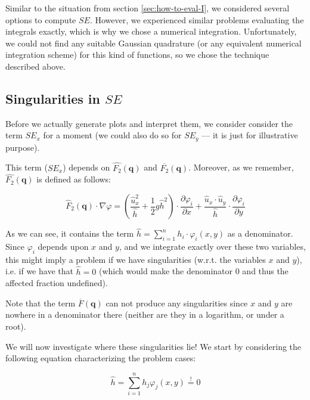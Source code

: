 \documentclass{article}
\newcommand{\pd}[2]{\dfrac{\partial #1}{\partial #2}}
\renewcommand{\phi}{\varphi}
\begin{document}
Similar to the situation from section \ref{sec:how-to-eval-I}, we considered several options to compute $SE$. However, we experienced similar problems evaluating the integrals exactly, which is why we chose a numerical integration. Unfortunately, we could not find any suitable Gaussian quadrature (or any equivalent numerical integration scheme) for this kind of functions, so we chose the technique described above.

\subsection{\texorpdfstring{Singularities in $SE$}{Singularities in SE}}
\label{sec:stiffness-analysis-singularities}

Before we actually generate plots and interpret them, we consider consider the term $SE_x$ for a moment (we could also do so for $SE_y$ --- it is just for illustrative purpose).

This term ($SE_x$) depends on $\widehat{F_2}(\mathbf{q})$ and $\overline{F_2}(\mathbf{q})$. Moreover, as we remember, $\widehat{F_2}(\mathbf{q})$ is defined as follows:

\begin{equation*}
  \widehat{F}_2(\mathbf{q}) \cdot \nabla \phi =
  \left( \frac{\widehat{u}_x^2}{\widehat{h}} + \frac{1}{2} g \widehat{h}^2 \right) \cdot \pd{\phi_i}{x} +
  \frac{\widehat{u}_x \cdot \widehat{u}_y }{\widehat{h}} \cdot \pd{\phi_i}{y}
\end{equation*}

As we can see, it contains the term $\widehat{h} = \sum_{i=1}^n h_i \cdot \phi_i(x,y)$ as a denominator. Since $\phi_i$ depends upon $x$ and $y$, and we integrate exactly over these two variables, this might imply a problem if we have singularities (w.r.t. the variables $x$ and $y$), i.e. if we have that $\widehat h = 0$ (which would make the denominator 0 and thus the affected fraction undefined).

Note that the term $\overline{F}(\mathbf{q})$ can not produce any singularities since $x$ and $y$ are nowhere in a denominator there (neither are they in a logarithm, or under a root).

We will now investigate where these singularities lie! We start by considering the following equation characterizing the problem cases:

\begin{equation*}
  \widehat{h} = \sum_{i=1}^n h_j \phi_j(x,y) \stackrel{!}{=} 0
\end{equation*}
\end{document}
